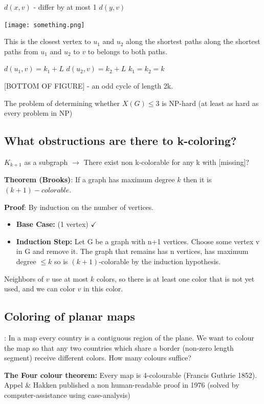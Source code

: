 \documentclass[9pt, letterpaper, oneside]{article}
\begin{document}
$d(x, v)$ - differ by at most 1
$d(y, v)$ 

\texttt{[image: something.png]}

This is the closest vertex to $u_1$ and $u_2$ along the shortest paths along the shortest paths from $u_1$ and $u_2$ to $v$ to belongs to both paths.

$d(u_1,v) = k_1 + L$
$d(u_2,v) = k_2 + L$
$k_1 = k_2 = k$

[BOTTOM OF FIGURE] - an odd cycle of length 2k.

The problem of determining whether $X(G) \leq 3$ is NP-hard (at least as hard as every problem in NP)

\subsection{What obstructions are there to k-coloring?}

$K_{k+1}$ as a subgraph $\to$ There exist non k-colorable for any k with [missing]?

\textbf{Theorem (Brooks)}: If a graph has maximum degree $k$ then it is $(k+1)-colorable$.

\textbf{Proof}: By induction on the number of vertices.

\begin{itemize}
    \item \textbf{Base Case:} (1 vertex) $\checkmark$
    \item \textbf{Induction Step:} Let G be a graph with n+1 vertices. Choose some vertex v in G and remove it. The graph that remains has n vertices, has maximum degree $\leq k$ so is $(k+1)$-colorable by the induction hypothesis.

\end{itemize}

Neighbors of $v$ use at most $k$ colors, so there is at least one color that is not yet used, and we can color $v$ in this color.

\subsection{Coloring of planar maps}: In a map every country is a contiguous region of the plane. We want to colour the map so that any two countries which share a border (non-zero length segment) receive different colors. How many colours suffice?

\textbf{The Four colour theorem:} Every map is 4-colourable (Francis Guthrie 1852). Appel \& Hakken published a non human-readable proof in 1976 (solved by computer-assistance using case-analysis)
 
\end{document}
